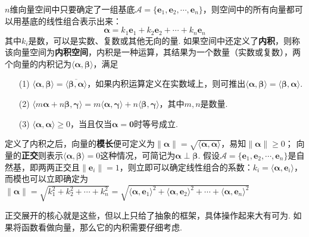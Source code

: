\documentclass[UTF8]{ctexart}
\newenvironment{reference}
    {\begin{tcolorbox}[enhanced, colback=GhostWhite, breakable=true, frame hidden, borderline west={1.5mm}{-2mm}{Gray}]}
    {\end{tcolorbox}}
\begin{document}
\begin{reference}
    \(n\)维向量空间中只要确定了一组基底\(\mathcal{A} = \{\bm{e}_1, \bm{e}_2, \cdots, \bm{e}_n\}\)，则空间中的所有向量都可以用基底的线性组合表示出来：
    \[\bm{\alpha} = k_1\bm{e}_1+k_2\bm{e}_2+\cdots+k_n\bm{e}_n\]
    其中\(k_i\)是数，可以是实数、复数或其他无向的量.
    \newline
    如果空间中还定义了\textbf{内积}，则称该向量空间为\textbf{内积空间}，内积是一种运算，其结果为一个数量（实数或复数），两个向量的内积记为\(\langle \bm{\alpha},\bm{\beta} \rangle\)，满足
    \begin{itemize}
        \item [(1)] \(\langle \bm{\alpha},\bm{\beta} \rangle = \overline{\langle \bm{\beta},\bm{\alpha} \rangle}\)，如果内积运算定义在实数域上，则可推出\(\langle \bm{\alpha},\bm{\beta} \rangle = \langle \bm{\beta},\bm{\alpha} \rangle\).
        \item [(2)] \(\langle m\bm{\alpha}+n\bm{\beta},\bm{\gamma} \rangle = m\langle \bm{\alpha},\bm{\gamma} \rangle + n\langle \bm{\beta},\bm{\gamma} \rangle\)，其中\(m,n\)是数量.
        \item [(3)] \(\langle \bm{\alpha},\bm{\alpha} \rangle \geq 0\)，当且仅当\(\bm{\alpha}=\bm{0}\)时等号成立.
    \end{itemize}
    定义了内积之后，向量的\textbf{模长}便可定义为\(\|\bm{\alpha}\|=\sqrt{\langle \bm{\alpha},\bm{\alpha} \rangle}\)，易知\(\|\bm{\alpha}\| \geq 0\)；
    \newline
    向量的\textbf{正交}则表示\(\langle \bm{\alpha},\bm{\beta} \rangle=0\)这种情况，可简记为\(\bm{\alpha} \perp \bm{\beta}\).
    \newline
    假设\(\mathcal{A}=\{\bm{e}_1, \bm{e}_2, \cdots, \bm{e}_n\}\)是自然基，即两两正交且\(\|\bm{e}_i\|=1\)，则立即可以确定线性组合的系数：\(k_i = \langle\bm{\alpha},\bm{e}_i\rangle\)，而模也可以立即确定为\(\|\bm{\alpha}\| = \sqrt{k_1^2+k_2^2+\cdots+k_n^2} = \sqrt{\langle\bm{\alpha},\bm{e}_1\rangle^2+\langle\bm{\alpha},\bm{e}_2\rangle^2+\cdots+\langle\bm{\alpha},\bm{e}_n\rangle^2}\)
\end{reference}

正交展开的核心就是这些，但以上只给了抽象的框架，具体操作起来大有可为. 如果将函数看做向量，那么它的内积需要仔细考虑.
\end{document}
